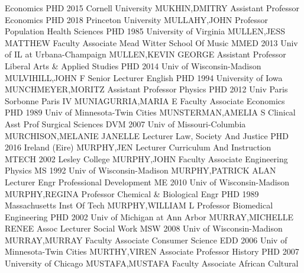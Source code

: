 \documentclass[
]{article}
\begin{document}
Economics \textbar PHD 2015 Cornell University \textbar MUKHIN,DMITRY
\textbar{}  \textbar Assistant Professor \textbar Economics
\textbar PHD 2018 Princeton University \textbar MULLAHY,JOHN \textbar{}
 \textbar Professor \textbar Population Health Sciences
\textbar PHD 1985 University of Virginia \textbar MULLEN,JESS MATTHEW
\textbar{}  \textbar Faculty Associate \textbar Mead Witter
School Of Music \textbar MMED 2013 Univ of IL at Urbana-Champaign
\textbar MULLEN,KEVIN GEORGE \textbar{}  \textbar Assistant
Professor \textbar Liberal Arts \& Applied Studies \textbar PHD 2014
Univ of Wisconsin-Madison \textbar MULVIHILL,JOHN F \textbar{}
 \textbar Senior Lecturer \textbar English \textbar PHD 1994
University of Iowa \textbar MUNCHMEYER,MORITZ \textbar{} 
\textbar Assistant Professor \textbar Physics \textbar PHD 2012 Univ
Paris Sorbonne Paris IV \textbar MUNIAGURRIA,MARIA E \textbar{}
 \textbar Faculty Associate \textbar Economics \textbar PHD
1989 Univ of Minnesota-Twin Cities \textbar MUNSTERMAN,AMELIA S
\textbar{}  \textbar Clinical Asst Prof \textbar Surgical
Sciences \textbar DVM 2007 Univ of Missouri-Columbia
\textbar MURCHISON,MELANIE JANELLE \textbar{} 
\textbar Lecturer \textbar Law, Society And Justice \textbar PHD 2016
Ireland (Eire) \textbar MURPHY,JEN \textbar{} 
\textbar Lecturer \textbar Curriculum And Instruction \textbar MTECH
2002 Lesley College \textbar MURPHY,JOHN \textbar{} 
\textbar Faculty Associate \textbar Engineering Physics \textbar MS 1992
Univ of Wisconsin-Madison \textbar MURPHY,PATRICK ALAN \textbar{}
 \textbar Lecturer \textbar Engr Professional Development
\textbar ME 2010 Univ of Wisconsin-Madison \textbar MURPHY,REGINA
\textbar{}  \textbar Professor \textbar Chemical \&
Biological Engr \textbar PHD 1989 Massachusetts Inst Of Tech
\textbar MURPHY,WILLIAM L \textbar{}  \textbar Professor
\textbar Biomedical Engineering \textbar PHD 2002 Univ of Michigan at
Ann Arbor \textbar MURRAY,MICHELLE RENEE \textbar{} 
\textbar Assoc Lecturer \textbar Social Work \textbar MSW 2008 Univ of
Wisconsin-Madison \textbar MURRAY,MURRAY \textbar{} 
\textbar Faculty Associate \textbar Consumer Science \textbar EDD 2006
Univ of Minnesota-Twin Cities \textbar MURTHY,VIREN \textbar{}
 \textbar Associate Professor \textbar History \textbar PHD
2007 University of Chicago \textbar MUSTAFA,MUSTAFA \textbar{}
 \textbar Faculty Associate \textbar African Cultural
\end{document}
